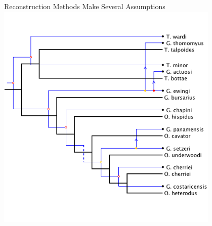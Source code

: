 \documentclass{beamer}
\begin{document}
\begin{frame}{Reconstruction Methods Make Several Assumptions}
\vspace{-0.2in}
\centering
\includegraphics[width=0.8\textwidth]{figures/jane6.png}


\end{frame}
\end{document}
